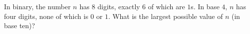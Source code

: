 In binary, the number $n$ has $8$ digits, exactly $6$ of which are $1$s. In base $4$, $n$ has four digits, none of which is $0$ or $1$. What is the largest possible value of $n$ (in base ten)?
